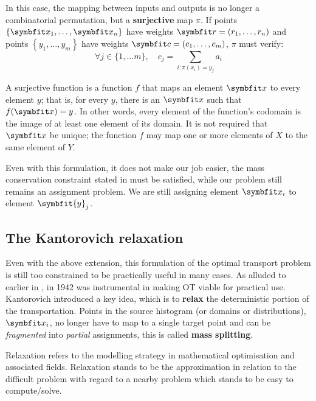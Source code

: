 In this case, the mapping between inputs and outputs is no longer a combinatorial permutation, but a \textbf{surjective} map $\pi$. If points $\{\bfitx_1, \ldots, \bfitx_n\}$ have weights $\bfitr=\left(r_1, \ldots, r_n\right)$ and points $\left\{y_1, \ldots, y_m\right\}$ have weights $\bfitc=\left(c_1, \ldots, c_m\right)$, $\pi$ must verify:
\begin{equation}
    \forall j \in\{1, \ldots m\}, \quad c_{j}=\sum_{i: \pi\left(x_{i}\right)=y_{j}} a_{i}
    \label{eqn:ot-mass-conserv}
\end{equation}

\begin{tcolorbox}[title=Surjective functions]
A surjective function is a function $f$ that maps an element $\bfitx$ to every element $y$; that is, for every $y$, there is an $\bfitx$ such that $f(\bfitx) = y$. In other words, every element of the function's codomain is the image of at least one element of its domain. It is not required that $\bfitx$ be unique; the function $f$ may map one or more elements of $X$ to the same element of $Y$. 
\end{tcolorbox}

Even with this formulation, it does not make our job easier, the mass conservation constraint stated in  must be satisfied, while our problem still remains an assignment problem. We are still assigning element $\bfitx_i$ to element $\symbfit{y}_j$.

\subsection{The Kantorovich relaxation}\label{ssec:ot-kantorovich-relax}

Even with the above extension, this formulation of the optimal transport problem is still too constrained to be practically useful in many cases. As alluded to earlier in , in 1942 \citeauthor{Kantorovich42} was instrumental in making OT viable for practical use. Kantorovich introduced a key idea, which is to \textbf{relax} the deterministic portion of the transportation. Points in the source histogram (or domains or distributions), $\bfitx_i$, no longer have to map to a single target point and can be \textit{fragmented} into \textit{partial} assignments, this is called \textbf{mass splitting}.

\begin{tcolorbox}[title=Relaxation]
Relaxation refers to the modelling strategy in mathematical optimisation and associated fields. Relaxation stands to be the approximation in relation to the difficult problem with regard to a nearby problem which stands to be easy to compute/solve.
\end{tcolorbox}

